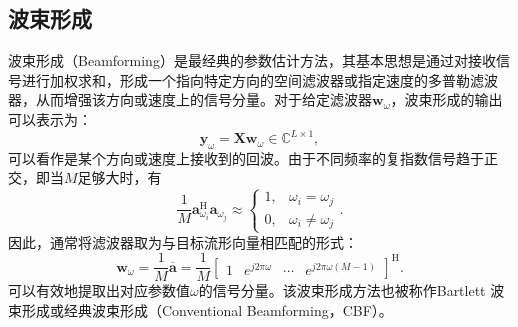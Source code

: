 \subsection{波束形成}
波束形成（Beamforming）是最经典的参数估计方法，其基本思想是通过对接收信号进行加权求和，形成一个指向特定方向的空间滤波器或指定速度的多普勒滤波器，从而增强该方向或速度上的信号分量。对于给定滤波器\( \bm{w}_{\omega} \)，波束形成的输出可以表示为：
\[
    \bm{y}_{\omega} = \mathbf{X} \bm{w}_{\omega} \in \mathbb{C}^{L \times 1},
\]
可以看作是某个方向或速度上接收到的回波。由于不同频率的复指数信号趋于正交，即当\( M \)足够大时，有
\[
    \frac{1}{M}\bm{a}_{\omega_i}^{\mathrm{H}} \bm{a}_{\omega_j} \approx \begin{cases}
        1, & \omega_i = \omega_j    \\
        0, & \omega_i \neq \omega_j
    \end{cases}.
\]
因此，通常将滤波器取为与目标流形向量相匹配的形式：
\[
    \bm{w}_{\omega} = \frac{1}{M} \overline{\bm{a}} =  \frac{1}{M} \begin{bmatrix}
        1 & e^{j 2 \pi \omega} & \cdots & e^{j 2 \pi \omega (M-1)}
    \end{bmatrix}^{\mathrm{H}}.
\]
可以有效地提取出对应参数值\( \omega \)的信号分量。该波束形成方法也被称作Bartlett 波束形成或经典波束形成（Conventional Beamforming，CBF）。

